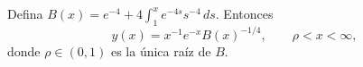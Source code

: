 Defina $B(x)=e^{-4}+4\int_1^x e^{-4s}s^{-4}\,ds$. Entonces
\[y(x)=x^{-1}e^{-x}B(x)^{-1/4},\qquad\rho<x<\infty,\]
donde $\rho\in(0,1)$ es la única raíz de $B$.
